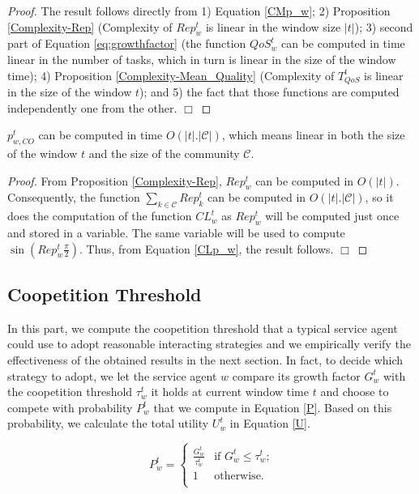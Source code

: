 \begin{proof}
The result follows directly from 1) Equation \ref{CMp_w}; 2)
Proposition \ref{Complexity-Rep} (Complexity of $Rep^t_w$ is
linear in the window size $|t|$); 3) second part of Equation
\ref{eq:growthfactor} (the function $QoS_w^t$ can be computed in
time linear in the number of tasks, which in turn is linear in the
size of the window time); 4) Proposition
\ref{Complexity-Mean_Quality} (Complexity of $T_{QoS}^t$ is linear
in the size of the window $t$); and 5) the fact that those
functions are computed independently one from the other. $\Box$
\end{proof}



\begin{proposition}\label{Complexity-Probability_Cooperation}
$p_{w,CO}^t$ can be computed in time $O(|t|.|\mathcal{C}|)$, which
means linear in both the size of the window $t$ and the size of
the community $\mathcal{C}$.
\end{proposition}

\begin{proof}
From Proposition \ref{Complexity-Rep}, $Rep^t_w$ can be computed
in $O(|t|)$. Consequently, the function $\sum_{k\in
\mathcal{C}}Rep^t_k$ can be computed in $O(|t|.|\mathcal{C}|)$, so
it does the computation of the function $CL_w^t$ as $Rep^t_w$ will
be computed just once and stored in a variable. The same variable
will be used to compute $\sin(Rep^t_w\frac{\pi}{2})$. Thus, from
Equation \ref{CLp_w}, the result follows. $\Box$
\end{proof}


\subsection{Coopetition Threshold}

In this part, we compute the coopetition threshold that a typical
service agent could use to adopt reasonable interacting strategies
and we empirically verify the effectiveness of the obtained
results in the next section. In fact, to decide which strategy to
adopt, we let the service agent $w$ compare its growth factor
$G_w^t$ with the coopetition threshold $\tau_w^t$ it holds at
current window time $t$ and choose to compete with probability
$P_w^t$ that we compute in Equation \ref{P}. Based on this
probability, we calculate the total utility $U_w^t$ in Equation
\ref{U}.

\begin{equation} \label{P}
P_w^t= \begin{cases}
\frac{G_w^t}{\tau_w^t}  & \text{if $G_w^t\leq \tau_w^t$;}\\
1 & \text{otherwise.}\\
\end{cases}
\end{equation}

